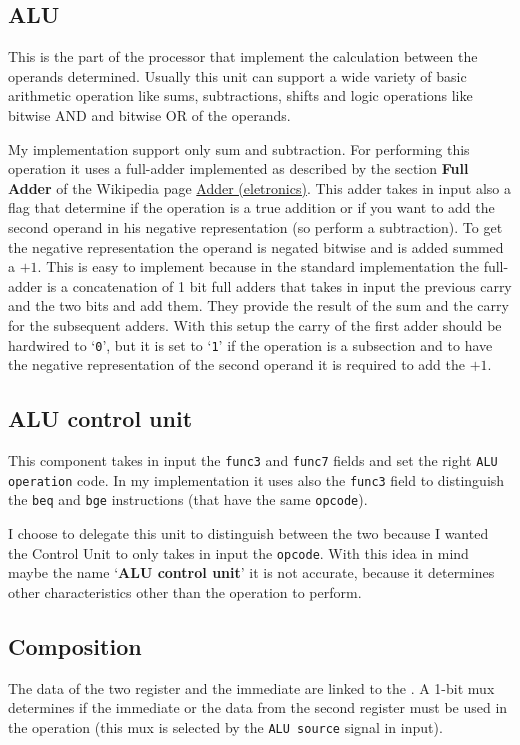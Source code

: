 \documentclass{article}
\begin{document}
\subsection{ALU}
This is the part of the processor that implement the calculation between the operands determined.
Usually this unit can support a wide variety of basic arithmetic operation like sums, subtractions,
shifts and logic operations like bitwise AND and bitwise OR of the operands. 

My implementation support only sum and subtraction. For performing this operation it uses a full-adder
implemented as described by the section \textbf{Full Adder} of the Wikipedia page 
\href{https://en.wikipedia.org/wiki/Adder_(electronics)}{Adder (eletronics)}. This adder takes in input
also a flag that determine if the operation is a true addition or if you want to add the second operand
in his negative representation (so perform a subtraction). To get the negative representation the 
operand is negated bitwise and is added summed a $+1$. This is easy to implement because in the standard
implementation the full-adder is a concatenation of 1 bit full adders that takes in input the previous
carry and the two bits and add them. They provide the result of the sum and the carry for the subsequent
adders. With this setup the carry of the first adder should be hardwired to `\texttt{0}', but it is
set to `\texttt{1}' if the operation is a subsection and to have the negative representation of the second
operand it is required to add the $+1$.

\subsection{ALU control unit} \label{ALU_CU}
This component takes in input the \texttt{func3} and \texttt{func7} fields and set the right 
\texttt{ALU operation} code. In my implementation it uses also the \texttt{func3} field to
distinguish the \texttt{beq} and \texttt{bge} instructions (that have the same \texttt{opcode}).

I choose to delegate this unit to distinguish between the two because I wanted the Control Unit
to only takes in input the \texttt{opcode}. With this idea in mind maybe the name 
`\textbf{ALU control unit}' it is not accurate, because it determines other characteristics other
than the operation to perform. 

\subsection*{Composition}
The data of the two register and the immediate are linked to the \ALU. A 1-bit \acrshort{mux} determines if
the immediate or the data from the second register must be used in the operation (this \acrshort{mux} is selected
by the \texttt{ALU source} signal in input).
\end{document}
